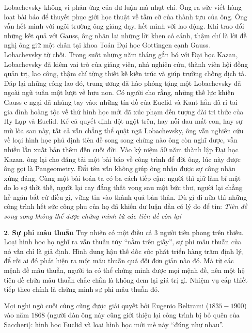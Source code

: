 	\begin{multicols}{2}
	Lobachevsky không vì phản ứng của dư luận mà nhụt chí. Ông ra sức viết hàng loạt bài báo để thuyết phục giới học thuật về tầm cỡ của thành tựu của ông. Ông vẫn hết mình với ngôi trường ông giảng dạy, hết mình với lao động. Khi trao đổi những kết quả với Gauss, ông nhận lại những lời khen có cánh, thậm chí là lời đề nghị ông giữ một chân tại khoa Toán Đại học Gottingen cạnh Gauss. Lobachevsky từ chối. Trong suốt những năm tháng gắn bó với Đại học Kazan, Lobachevsky đã kiêm vai trò của giảng viên, nhà nghiên cứu, thành viên hội đồng quản trị, lao công, thậm chí từng thiết kế kiến trúc và giúp trường chống dịch tả.
	\vskip 0.1cm
	Đáp lại những công lao đó, trung ương đã hào phóng tặng một Lobachevsky đã ngoài ngũ tuần một lượt về hưu non. Có người cho rằng, những thế lực khiến Gauss e ngại đã nhúng tay vào: những tín đồ của Euclid và Kant hẳn đã rỉ tai gia đình hoàng tộc về thứ hình học mới đã xúc phạm đến tượng đài tri thức của  Hy Lạp và Euclid. Kể cả quyết định đột ngột trên, hay nỗi đau mất con, hay sự mù lòa sau này, tất cả vẫn chẳng thể quật ngã Lobachevsky, ông vẫn nghiên cứu về loại hình học phủ định tiên đề song song chừng nào ông còn nghĩ được, vẫn nhiều lần xuất bản thêm đến cuối đời. Vào kỷ niệm $50$ năm thành lập Đại học Kazan, ông lại cho đăng tải một bài báo về công trình để đời ông, lúc này được ông gọi là Pangeometry. Đổi tên vẫn không giúp ông nhận được sự công nhận xứng đáng.
	\vskip 0.1cm
	Cùng một bài toán ta có ba cách tiếp cận: người thì giữ làm bí mật do lo sợ thời thế, người lại cay đắng thất vọng sau một bức thư, người lại chẳng hề ngán bất cứ điều gì, vững tin vào thành quả bản thân. Dù gì đi nữa thì những công trình hết sức công phu của họ đã khiến dư luận dần có lý do để tin:
	\vskip 0.1cm
	\textit{Tiên đề song song không thể được chứng minh từ các tiên đề còn lại} 
	\vskip 0.1cm
	
	$\pmb{2.}$ \textbf{\color{lichsutoanhoc}Sự phi mâu thuẫn}
	\vskip 0.1cm
	Tuy nhiên có một điều cả $3$ người tiên phong trên thiếu. Loại hình học họ nghĩ ra vẫn thuần túy ``nằm trên giấy'', sự phi mâu thuẫn của nó vẫn chỉ là giả định. Hình dung hậu thế dốc sức phát triển hàng trăm định lý, để rồi ai đó phát hiện ra một mâu thuẫn quá đỗi đơn giản nào đó. Mà từ các mệnh đề mâu thuẫn, người ta có thể chứng minh được mọi mệnh đề, nên một hệ tiên đề chứa mâu thuẫn chắc chắn là không đem lại giá trị gì. Nhiệm vụ cấp thiết tiếp theo chính là chứng minh sự phi mâu thuẫn đó.
	\vskip 0.1cm
	
	Mọi nghi ngờ cuối cùng cũng được giải quyết bởi Eugenio Beltrami ($1835-1900$) vào năm $1868$ (người đàn ông này cũng giới thiệu lại công trình bị bỏ quên của Saccheri): hình học Euclid và loại hình học mới mẻ này ``đúng như nhau''. 
	\vskip 0.1cm


\end{multicols}
